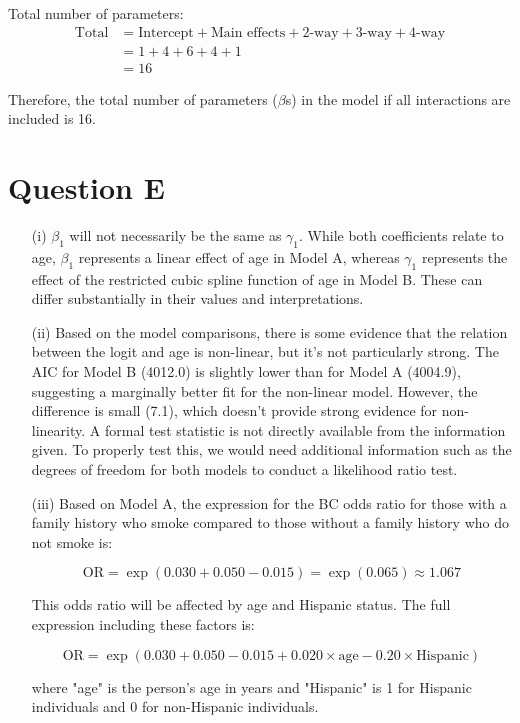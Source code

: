 \documentclass{article}
\begin{document}
Total number of parameters:
\begin{align*}
    \text{Total} &= \text{Intercept} + \text{Main effects} + \text{2-way} + \text{3-way} + \text{4-way} \\
    &= 1 + 4 + 6 + 4 + 1 \\
    &= 16
\end{align*}

Therefore, the total number of parameters ($\beta$s) in the model if all interactions are included is 16.

\newpage
\section{Question E}
\begin{enumerate}
    \item[(i)] $\beta_1$ will not necessarily be the same as $\gamma_1$. While both coefficients relate to age, $\beta_1$ represents a linear effect of age in Model A, whereas $\gamma_1$ represents the effect of the restricted cubic spline function of age in Model B. These can differ substantially in their values and interpretations.

    \item[(ii)] Based on the model comparisons, there is some evidence that the relation between the logit and age is non-linear, but it's not particularly strong. The AIC for Model B (4012.0) is slightly lower than for Model A (4004.9), suggesting a marginally better fit for the non-linear model. However, the difference is small (7.1), which doesn't provide strong evidence for non-linearity. A formal test statistic is not directly available from the information given. To properly test this, we would need additional information such as the degrees of freedom for both models to conduct a likelihood ratio test.

    \item[(iii)] Based on Model A, the expression for the BC odds ratio for those with a family history who smoke compared to those without a family history who do not smoke is:

    \[ \text{OR} = \exp(0.030 + 0.050 - 0.015) = \exp(0.065) \approx 1.067 \]

    This odds ratio will be affected by age and Hispanic status. The full expression including these factors is:

    \[ \text{OR} = \exp(0.030 + 0.050 - 0.015 + 0.020 \times \text{age} - 0.20 \times \text{Hispanic}) \]

    where "age" is the person's age in years and "Hispanic" is 1 for Hispanic individuals and 0 for non-Hispanic individuals.
\end{enumerate}
\end{document}

